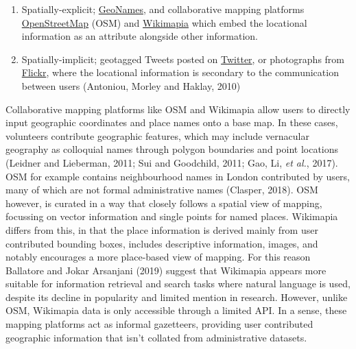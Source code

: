 \documentclass[
  letterpaper,
  11pt,
  english,
  onehalfspacing,
  headsepline]{MastersDoctoralThesis}
\begin{document}
\begin{enumerate}
\def\labelenumi{\arabic{enumi}.}
\item
  Spatially-explicit; \href{https://geonames.org}{GeoNames}, and
  collaborative mapping platforms
  \href{https://openstreetmap.org}{OpenStreetMap} (OSM) and
  \href{https://wikimapia.org}{Wikimapia} which embed the locational
  information as an attribute alongside other information.
\item
  Spatially-implicit; geotagged Tweets posted on
  \href{https://twitter.com}{Twitter}, or photographs from
  \href{https://flickr.com}{Flickr}, where the locational information is
  secondary to the communication between users (Antoniou, Morley and
  Haklay, 2010)
\end{enumerate}

Collaborative mapping platforms like OSM and Wikimapia allow users to
directly input geographic coordinates and place names onto a base map.
In these cases, volunteers contribute geographic features, which may
include vernacular geography as colloquial names through polygon
boundaries and point locations (Leidner and Lieberman, 2011; Sui and
Goodchild, 2011; Gao, Li, \emph{et al.}, 2017). OSM for example contains
neighbourhood names in London contributed by users, many of which are
not formal administrative names (Clasper, 2018). OSM however, is curated
in a way that closely follows a spatial view of mapping, focussing on
vector information and single points for named places. Wikimapia differs
from this, in that the place information is derived mainly from user
contributed bounding boxes, includes descriptive information, images,
and notably encourages a more place-based view of mapping. For this
reason Ballatore and Jokar Arsanjani (2019) suggest that Wikimapia
appears more suitable for information retrieval and search tasks where
natural language is used, despite its decline in popularity and limited
mention in research. However, unlike OSM, Wikimapia data is only
accessible through a limited API. In a sense, these mapping platforms
act as informal gazetteers, providing user contributed geographic
information that isn't collated from administrative datasets.
\end{document}
